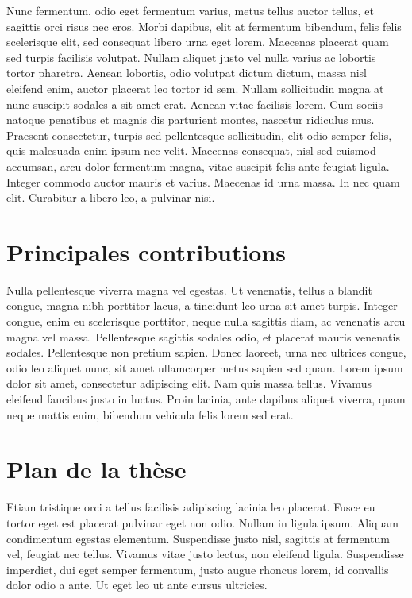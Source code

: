  Nunc fermentum, odio eget fermentum varius, metus tellus auctor tellus, et sagittis orci risus nec eros. Morbi dapibus, elit at fermentum bibendum, felis felis scelerisque elit, sed consequat libero urna eget lorem. Maecenas placerat quam sed turpis facilisis volutpat. Nullam aliquet justo vel nulla varius ac lobortis tortor pharetra. Aenean lobortis, odio volutpat dictum dictum, massa nisl eleifend enim, auctor placerat leo tortor id sem. Nullam sollicitudin magna at nunc suscipit sodales a sit amet erat. Aenean vitae facilisis lorem. Cum sociis natoque penatibus et magnis dis parturient montes, nascetur ridiculus mus. Praesent consectetur, turpis sed pellentesque sollicitudin, elit odio semper felis, quis malesuada enim ipsum nec velit. Maecenas consequat, nisl sed euismod accumsan, arcu dolor fermentum magna, vitae suscipit felis ante feugiat ligula. Integer commodo auctor mauris et varius. Maecenas id urna massa. In nec quam elit. Curabitur a libero leo, a pulvinar nisi.

\section*{Principales contributions}

 Nulla pellentesque viverra magna vel egestas. Ut venenatis, tellus a blandit congue, magna nibh porttitor lacus, a tincidunt leo urna sit amet turpis. Integer congue, enim eu scelerisque porttitor, neque nulla sagittis diam, ac venenatis arcu magna vel massa. Pellentesque sagittis sodales odio, et placerat mauris venenatis sodales. Pellentesque non pretium sapien. Donec laoreet, urna nec ultrices congue, odio leo aliquet nunc, sit amet ullamcorper metus sapien sed quam. Lorem ipsum dolor sit amet, consectetur adipiscing elit. Nam quis massa tellus. Vivamus eleifend faucibus justo in luctus. Proin lacinia, ante dapibus aliquet viverra, quam neque mattis enim, bibendum vehicula felis lorem sed erat.

\section*{Plan de la th\`ese}

 Etiam tristique orci a tellus facilisis adipiscing lacinia leo placerat. Fusce eu tortor eget est placerat pulvinar eget non odio. Nullam in ligula ipsum. Aliquam condimentum egestas elementum. Suspendisse justo nisl, sagittis at fermentum vel, feugiat nec tellus. Vivamus vitae justo lectus, non eleifend ligula. Suspendisse imperdiet, dui eget semper fermentum, justo augue rhoncus lorem, id convallis dolor odio a ante. Ut eget leo ut ante cursus ultricies.

